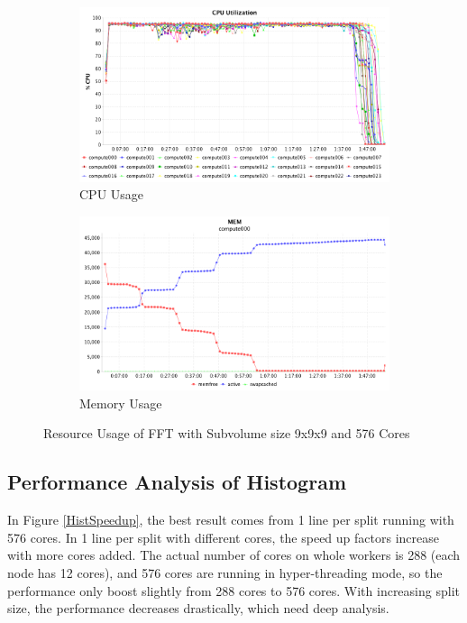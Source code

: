 \begin{figure}[h]
\centering
\begin{subfigure}{1\textwidth}
  \centering
  \includegraphics[width=1\linewidth]{figures/FFT474_576_CPU.png}
  \caption{CPU Usage}
  \label{FFT474_576_CPU}
\end{subfigure}
\begin{subfigure}{1\textwidth}
  \centering
  \includegraphics[width=1\linewidth]{figures/FFT474_576_MEM.png}
  \caption{Memory Usage}
  \label{FFT474_576_MEM}
\end{subfigure}
\caption{Resource Usage of FFT with Subvolume size 9x9x9 and 576 Cores}
\label{FFT474_576}
\end{figure}


\subsection{Performance Analysis of Histogram}

In Figure \ref{HistSpeedup}, the best result comes from 1 line per split running with 576 cores. In 1 line per split with different cores, the speed up factors increase with more cores added. The actual number of cores on whole workers is 288 (each node has 12 cores), and 576 cores are running in hyper-threading mode, so the performance only boost slightly from 288 cores to 576 cores. With increasing split size, the performance decreases drastically, which need deep analysis. 

